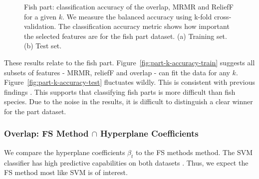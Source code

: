 \documentclass[runningheads]{llncs}
\begin{document}
\begin{figure}[htb]
  \caption[Two numerical solutions]{
    Fish part: classification accuracy of the overlap, MRMR and ReliefF for a given $k$.
    We measure the balanced accuracy using k-fold cross-validation.
    The classification accuracy metric shows how important the selected features are for the fish part dataset.
    (a) Training set. (b) Test set.}
\end{figure}

These results relate to the fish part.
Figure~\ref{fig:part-k-accuracy-train} suggests all subsets of features - MRMR, reliefF and overlap - can fit the data for any $k$.
Figure~\ref{fig:part-k-accuracy-test} fluctuates wildly.
This is consistent with previous findings \cite{wood2021classification, wood2021feature}.
This supports that classifying fish parts is more difficult than fish species.
Due to the noise in the results, it is difficult to distinguish a clear winner for the part dataset.

\subsubsection{Overlap: FS Method $\cap$ Hyperplane Coefficients}
\label{sec:results-visualisation-overlap-fs-hyperplane}

We compare the hyperplane coefficients $\beta_t$ to the FS methods method.
The SVM classifier has high predictive capabilities on both datasets \cite{wood2021classification, wood2021feature}.
Thus, we expect the FS method most like SVM is of interest.
\end{document}

